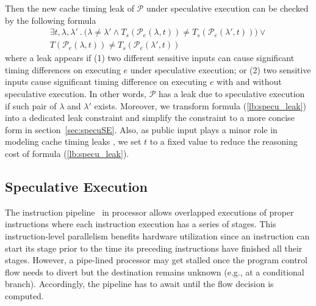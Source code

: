 \documentclass[sigconf]{acmart}
\newcommand\ignore[1]{}
\newcommand{\prog}{\mathcal{P}}
\begin{document}
Then the new cache timing leak of $\prog$ under speculative execution can be 
checked by the following formula 
%
\begin{multline}
\label{lb:specu_leak}
\mathit{\exists t,\lambda,\lambda'~.~
	\big(
			\lambda \neq \lambda' \wedge T_{s}({\prog_e}(\lambda,t)) 
			\neq T_{s}({\prog_e}(\lambda',t))}
	\big)
	\vee 
	\\  
	T({\prog_e}(\lambda,t)) \neq T_{s}({\prog_e}(\lambda',t)) ~~~
\end{multline}
%
where a leak appears if (1) two different sensitive inputs can cause significant 
timing differences on executing $\mathit{e}$ under speculative execution; or (2) 
two sensitive inputs cause significant timing difference on executing $\mathit{e}$ 
with and without speculative execution. In other words, $\prog$ has a leak due to 
speculative execution if such pair of $\lambda$ and $\lambda'$ exists. Moreover, 
we transform formula (\ref{lb:specu_leak}) into a dedicated leak constraint and 
simplify the constraint to a more concise form in section~\ref{sec:specuSE}. Also, 
as public input plays a minor role in modeling cache timing leaks
\cite{WangBLWZW19}, we set $t$ to a fixed value to reduce the reasoning cost 
of formula (\ref{lb:specu_leak}). 

\ignore{
Also, we assume $\prog$ has the same set of instructions on each program path and 
speculative execution only changes the cache state. 
}





\subsection{Speculative Execution}
\label{sec:specu}

The instruction pipeline~\cite{RamamoorthyL77} in processor allows overlapped 
executions of proper instructions where each instruction execution has a series 
of stages. This instruction-level parallelism benefits hardware utilization since 
an instruction can start its stage prior to the time its preceding instructions 
have finished all their stages. However, a pipe-lined processor may get stalled 
once the program control flow needs to divert but the destination remains unknown 
(e.g., at a conditional branch). Accordingly, the pipeline has to await until 
the flow decision is computed.
\end{document}

